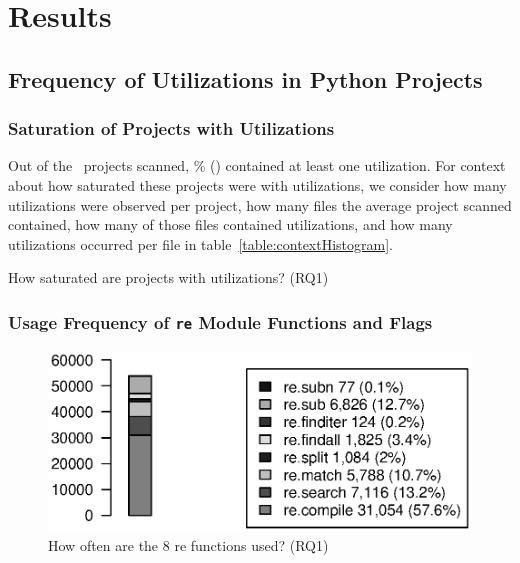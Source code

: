 \section{Results}
\label{sec:results}
\subsection{Frequency of Utilizations in Python Projects}
\subsubsection{Saturation of Projects with Utilizations}
Out of the \ projects scanned, \% () contained at least one utilization.  For context about how saturated these projects were with utilizations, we consider how many utilizations were observed per project, how many files the average project scanned contained, how many of those files contained utilizations, and how many utilizations occurred per file in table~\ref{table:contextHistogram}.

\begin{table}[tb]
\caption{How saturated are projects with utilizations? (RQ1)}
\label{table:contextHistogram}
\begin{center}

\end{center}
\end{table}

\subsubsection{Usage Frequency of {\tt re} Module Functions and Flags}

\begin{figure}[tb]
\centering
\includegraphics[width=\columnwidth]{../analysis_output/partFunctions.eps}
\caption{How often are the 8 re functions used? (RQ1)}
\label{fig:partFunctions}
\end{figure}

